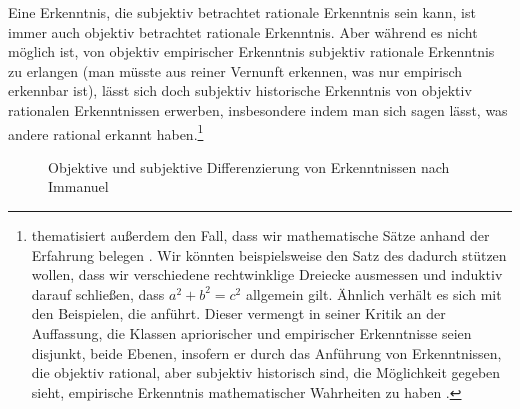 Eine Erkenntnis, die subjektiv betrachtet rationale Erkenntnis sein kann, ist
immer auch objektiv betrachtet rationale Erkenntnis. Aber während es
nicht möglich ist, von objektiv empirischer Erkenntnis subjektiv rationale
Erkenntnis zu erlangen (man müsste aus reiner Vernunft erkennen, was nur
empirisch erkennbar ist), lässt sich doch subjektiv historische Erkenntnis von
objektiv rationalen Erkenntnissen erwerben, insbesondere indem man sich sagen
lässt, was andere rational erkannt haben.\footnote{
thematisiert außerdem den Fall, dass wir mathematische Sätze anhand der
Erfahrung belegen
\parencite[vgl.][\S~19]{Wolff:Discursuspraeliminarisdephilosophiaingenere1996}.
Wir könnten beispielsweise den Satz des  dadurch stützen
wollen, dass wir verschiedene rechtwinklige Dreiecke ausmessen und induktiv darauf schließen,
dass $a^2 + b^2 = c^2$ allgemein gilt. Ähnlich verhält es sich mit den
Beispielen, die  anführt.
Dieser vermengt in seiner Kritik an der Auffassung, die Klassen apriorischer und
empirischer Erkenntnisse seien disjunkt, beide Ebenen, insofern er durch das
Anführung von Erkenntnissen, die objektiv rational, aber subjektiv historisch
sind, die Möglichkeit gegeben sieht, empirische Erkenntnis mathematischer
Wahrheiten zu haben \parencite[vgl.][\,ff.]{Kripke:NameundNotwendigkeit1981}.} \begin{figure}[htb]
\begin{minipage}[t]{\textwidth}
\centering
{}
  \caption{Objektive und subjektive Differenzierung von Erkenntnissen nach
  Immanuel
  }\label{abbildung:ZeichnungErkenntnisartennachKant.pdf}
\end{minipage}
\end{figure}
